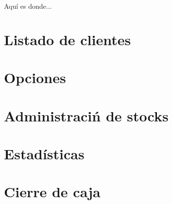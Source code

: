 Aqu\'i es donde...

\section{Listado de clientes}
\label{sec:ui.clientlist}

\section{Opciones}
\label{sec:ui.options}

\section{Administraci\'n de stocks}
\label{sec:ui.stocks}

\section{Estad\'isticas}
\label{sec:ui.statistics}

\section{Cierre de caja}
\label{sec:ui.closecash}
